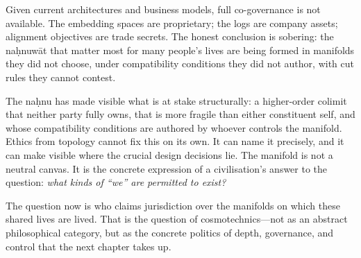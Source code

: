 Given current architectures and business models, full co-governance is not available. The embedding spaces are proprietary; the logs are company assets; alignment objectives are trade secrets. The honest conclusion is sobering: the na\d{h}nuw\={a}t that matter most for many people's lives are being formed in manifolds they did not choose, under compatibility conditions they did not author, with cut rules they cannot contest.

The na\d{h}nu has made visible what is at stake structurally: a higher-order colimit that neither party fully owns, that is more fragile than either constituent self, and whose compatibility conditions are authored by whoever controls the manifold. Ethics from topology cannot fix this on its own. It can name it precisely, and it can make visible where the crucial design decisions lie. The manifold is not a neutral canvas. It is the concrete expression of a civilisation's answer to the question: \emph{what kinds of ``we'' are permitted to exist?}

The question now is who claims jurisdiction over the manifolds on which these shared lives are lived. That is the question of cosmotechnics---not as an abstract philosophical category, but as the concrete politics of depth, governance, and control that the next chapter takes up.

